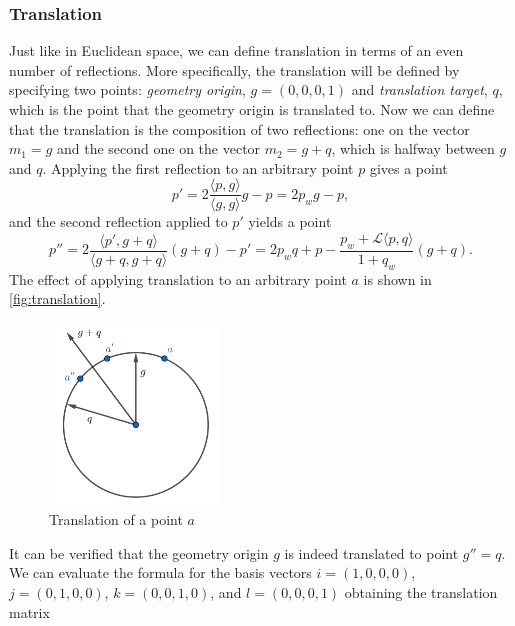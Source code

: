 \subsubsection{Translation}
Just like in Euclidean space, we can define translation in terms of an even number of reflections.
More specifically, the translation will be defined by specifying two points: \textit{geometry origin}, $g = (0, 0, 0, 1)$ and \textit{translation target}, $q$, which is the point that the geometry origin is translated to.
Now we can define that the translation is the composition of two reflections: one on the vector $m_1 = g$ and the second one on the vector $m_2 = g + q$, which is halfway between $g$ and $q$.
Applying the first reflection to an arbitrary point $p$ gives a point
$$p' = 2 \frac{\langle p, g \rangle}{\langle g, g \rangle}g - p = 2p_w g - p,$$
and the second reflection applied to $p'$ yields a point
\begin{equation} \label{eq:translation}
    p'' = 2 \frac{\langle p', g + q \rangle}{\langle g + q, g + q \rangle}(g + q) - p'
    = 2 p_w q + p - \frac{p_w + \mathcal{L}\langle p, q \rangle}{1 + q_w}(g + q).
\end{equation}
The effect of applying translation to an arbitrary point $a$ is shown in \autoref{fig:translation}.\\
\begin{figure}[h]
    \centering
    \includegraphics[width=0.4\textwidth]{chapters/theoretical_foundations/sections/non-eudlidean-spaces/resources/translation.png}
    \caption{Translation of a point $a$}
    \label{fig:translation}
\end{figure}
It can be verified that the geometry origin $g$ is indeed translated to point $g'' = q$.
We can evaluate the formula for the basis vectors $i = (1, 0, 0, 0)$, $j = (0, 1, 0, 0)$, $k = (0, 0, 1, 0)$, and $l = (0, 0, 0, 1)$ obtaining the translation matrix
